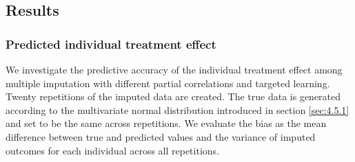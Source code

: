 	
	\subsection{Results}
	\label{sec:4.5.3}
	\subsubsection{Predicted individual treatment effect}
	We investigate the predictive accuracy of the individual treatment effect among multiple imputation with different partial correlations and targeted learning. Twenty repetitions of the imputed data are created. The true data is generated according to the multivariate normal distribution introduced in section \ref{sec:4.5.1} and set to be the same across repetitions. We evaluate the bias as the mean difference between true and predicted values and the variance of imputed outcomes for each individual across all repetitions.   
	
